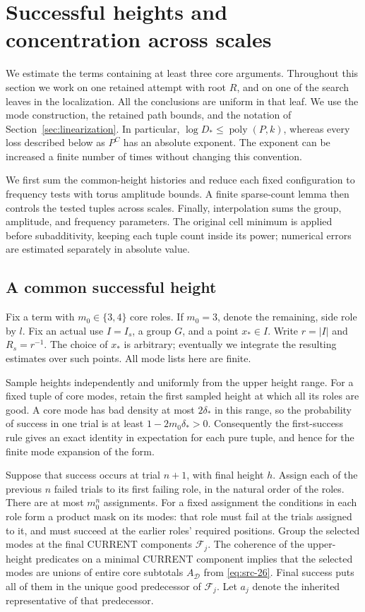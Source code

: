\section{Successful heights and concentration across scales}
\label{sec:counting}

We estimate the terms containing at least three core arguments.  Throughout
this section we work on one retained attempt with root $R$, and on one of
the search leaves in the localization.  All the conclusions are uniform
in that leaf.  We use the mode construction, the retained path bounds, and
the notation of Section~\ref{sec:linearization}.  In particular,
$\log D_*\leq\operatorname{poly}(P,k)$, whereas every loss described below
as $P^C$ has an absolute exponent.  The exponent can be increased a finite
number of times without changing this convention.

We first sum the common-height histories and reduce each fixed
configuration to frequency tests with torus amplitude bounds.
A finite sparse-count lemma then controls the tested tuples across
scales.  Finally, interpolation sums the group, amplitude, and
frequency parameters.  The original cell minimum is applied before
subadditivity, keeping each tuple count inside its power; numerical
errors are estimated separately in absolute value.

\subsection{A common successful height}

Fix a term with $m_0\in\{3,4\}$ core roles.  If $m_0=3$, denote the
remaining, side role by $l$.  Fix an actual use $I=I_s$, a group $G$, and
a point $x_*\in I$.  Write $r=|I|$ and $R_s=r^{-1}$.  The choice of $x_*$
is arbitrary; eventually we integrate the resulting estimates over such
points.  All mode lists here are finite.

Sample heights independently and uniformly from the upper height range.
For a fixed tuple of core modes, retain the first sampled height at which
all its roles are good.  A core mode has bad density at most $2\delta_*$
in this range, so the probability of success in one trial is at least
$1-2m_0\delta_*>0$.  Consequently the first-success rule gives an exact
identity in expectation for each pure tuple, and hence for the finite
mode expansion of the form.

Suppose that success occurs at trial $n+1$, with final height $h$.
Assign each of the previous $n$ failed trials to its first failing role,
in the natural order of the roles.  There are at most $m_0^n$ assignments.
For a fixed assignment the conditions in each role form a product mask
on its modes: that role must fail at the trials assigned to it, and must
succeed at the earlier roles' required positions.  Group the selected
modes at the final CURRENT components $\mathcal F_j$.  The coherence of
the upper-height predicates on a minimal CURRENT component implies that
the selected modes are unions of entire core subtotals
$A_{\mathcal D}$ from \eqref{eq:src-26}.  Final success puts all of them
in the unique good predecessor of $\mathcal F_j$.  Let $a_j$ denote the
inherited representative of that predecessor.

